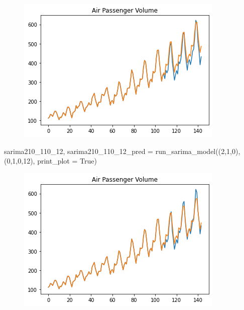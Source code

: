 \documentclass[
  letterpaper,
  DIV=11,
  numbers=noendperiod]{scrartcl}
\newenvironment{Shaded}{\begin{snugshade}}{\end{snugshade}}
\newcommand{\DecValTok}[1]{\textcolor[rgb]{0.68,0.00,0.00}{#1}}
\newcommand{\NormalTok}[1]{\textcolor[rgb]{0.00,0.23,0.31}{#1}}
\newcommand{\OperatorTok}[1]{\textcolor[rgb]{0.37,0.37,0.37}{#1}}
\newcommand{\VariableTok}[1]{\textcolor[rgb]{0.07,0.07,0.07}{#1}}
\begin{document}
\begin{figure}[H]

{\centering \includegraphics{main_files/figure-pdf/cell-29-output-1.png}

}

\end{figure}

\begin{Shaded}
\begin{Highlighting}[]
\NormalTok{sarima210\_110\_12, sarima210\_110\_12\_pred }\OperatorTok{=}\NormalTok{ run\_sarima\_model((}\DecValTok{2}\NormalTok{,}\DecValTok{1}\NormalTok{,}\DecValTok{0}\NormalTok{), (}\DecValTok{0}\NormalTok{,}\DecValTok{1}\NormalTok{,}\DecValTok{0}\NormalTok{,}\DecValTok{12}\NormalTok{), print\_plot }\OperatorTok{=} \VariableTok{True}\NormalTok{)}
\end{Highlighting}
\end{Shaded}

\begin{figure}[H]

{\centering \includegraphics{main_files/figure-pdf/cell-30-output-1.png}

}

\end{figure}
\end{document}
